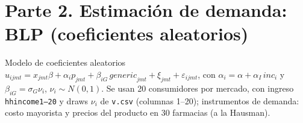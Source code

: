 \documentclass[answers]{exam}
\begin{document}
\section*{Parte 2. Estimaci\'on de demanda: BLP (coeficientes aleatorios)}

Modelo de coeficientes aleatorios
$u_{ijmt}=x_{jmt}\beta+\alpha_i p_{jmt}+\beta_{iG}\,\mathit{generic}_{jmt}+\xi_{jmt}+\varepsilon_{ijmt}$,
con $\alpha_i=\alpha+\alpha_I\,\mathit{inc}_i$ y $\beta_{iG}=\sigma_G\nu_i$, $\nu_i\sim N(0,1)$.
Se usan 20 consumidores por mercado, con ingreso \texttt{hhincome1--20} y draws $\nu_i$ de
\texttt{v.csv} (columnas 1--20); instrumentos de demanda: costo mayorista y precios del producto en 30
farmacias (a la Hausman).
\end{document}
